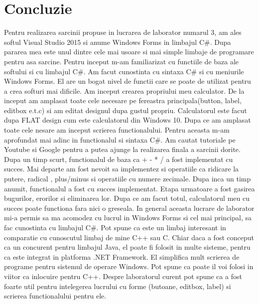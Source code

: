 \section*{Concluzie}
Pentru realizarea sarcinii propuse in lucrarea de laborator numarul 3, am ales softul Visual Studio 2015 si anume Windows Forms in limbajul 
\textsc{\large C\#}. Dupa pararea mea este unul dintre cele mai usoare si mai simple limbaje de programare pentru asa sarcine. Pentru inceput m-am familiarizat cu functiile de baza ale softului si cu limbajul \textsc{\large C\#}. Am facut cunostinta cu sintaxa \textsc{\large C\#} si cu meniurile Windows Forms. El are un bogat nivel de functii care se poate de utilizat pentru a crea softuri mai dificile. Am inceput crearea propriului meu calculator. De la inceput am amplasat toate cele necesare pe fereastra principala(button, label, editbox e.t.c) si am editat designul dupa gustul propriu. Calculatorul este facut dupa FLAT design cum este calculatorul din Windows 10. Dupa ce am amplasat toate cele nesare am inceput scrierea functionalului. Pentru aceasta m-am aprofundat mai adinc in functionalul si sintaxa \textsc{\large C\#}. Am cautat tutoriale pe Youtube si Google pentru a putea ajunge la realizarea finala a sarcinii dorite. Dupa un timp scurt, functionalul de baza ca + - * / a fost implementat cu succes. Mai departe am fost nevoit sa implementez si operatiile ca ridicare la putere, radical , plus/minus si operatiile cu numere zecimale. Dupa inca un timp anumit, functionalul a fost cu succes implementat. Etapa urmatoare a fost gasirea bugurilor, erorilor si eliminarea lor. Dupa ce am facut totul, calculatorul meu cu succes poate functiona fara nici o greseala.
In general aceasta lucrare de laborator mi-a permis sa ma acomodez cu lucrul in Windows Forms si cel mai principal, sa fac cunostinta cu limbajul \textsc{\large C\#}. Pot spune ca este un limbaj interesant in comparatie cu cunoscutul limbaj de mine C++ sau C. Chiar daca a fost conceput ca un concurent pentru limbajul Java, el poate fi folosit in multe sisteme, pentru ca este integrat in platforma .NET Framework. El simplifica mult scrierea de programe pentru sistemul de operare Windows. Pot spune ca poate il voi folosi in viitor ca inlocuire pentru C++. Despre laboratorul curent pot spune ca a fost foarte util pentru intelegerea lucrului cu forme (butoane, editbox, label) si scrierea functionalului pentru ele.
\clearpage